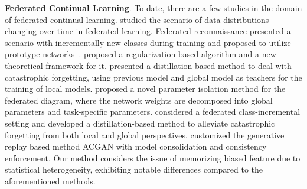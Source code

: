 \textbf{Federated Continual Learning}.
To date, there are a few studies in the domain of federated continual learning.
\cite{casado2020federated} studied the scenario of data distributions changing over time in federated learning.
Federated reconnaissance presented a scenario with incrementally new classes during training and proposed to utilize prototype networks~\citep{hendryx2021federated}.
\cite{guo2021new} proposed a regularization-based algorithm and a new theoretical framework for it.
\cite{DBLP:journals/corr/abs-2109-04197} presented a distillation-based method to deal with catastrophic forgetting, using previous model and global model as teachers for the training of local models.
\cite{yoon2021federated} proposed a novel parameter isolation method for the federated diagram, where the network weights are decomposed into global parameters and task-specific parameters.
\cite{DBLP:conf/cvpr/DongWFSXW022} considered a federated class-incremental setting and developed a distillation-based method to alleviate catastrophic forgetting from both local and global perspectives.
\cite{DBLP:conf/iclr/QiZ023} customized the generative replay based method ACGAN with model consolidation and consistency enforcement.
Our method considers the issue of memorizing biased feature due to statistical heterogeneity, exhibiting notable differences compared to the aforementioned methods.



%